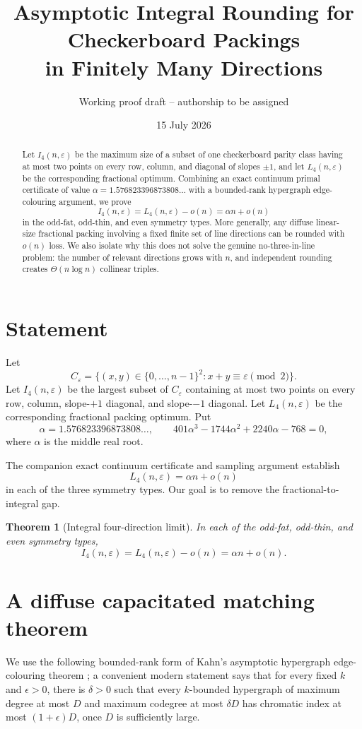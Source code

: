 \documentclass[11pt]{article}
\title{Asymptotic Integral Rounding for Checkerboard Packings\\in Finitely Many Directions}
\author{Working proof draft -- authorship to be assigned}
\date{15 July 2026}
\newtheorem{theorem}{Theorem}[section]
\begin{document}
\maketitle

\begin{abstract}
Let $I_4(n,\varepsilon)$ be the maximum size of a subset of one checkerboard parity class having at most two points on every row, column, and diagonal of slopes $\pm1$, and let $L_4(n,\varepsilon)$ be the corresponding fractional optimum. Combining an exact continuum primal certificate of value $\alpha=1.576823396873808\ldots$ with a bounded-rank hypergraph edge-colouring argument, we prove
\[
I_4(n,\varepsilon)=L_4(n,\varepsilon)-o(n)=\alpha n+o(n)
\]
in the odd-fat, odd-thin, and even symmetry types. More generally, any diffuse linear-size fractional packing involving a fixed finite set of line directions can be rounded with $o(n)$ loss. We also isolate why this does not solve the genuine no-three-in-line problem: the number of relevant directions grows with $n$, and independent rounding creates $\Theta(n\log n)$ collinear triples.
\end{abstract}

\section{Statement}
Let
\[
C_\varepsilon=\{(x,y)\in\{0,\dots,n-1\}^2:x+y\equiv\varepsilon\pmod2\}.
\]
Let $I_4(n,\varepsilon)$ be the largest subset of $C_\varepsilon$ containing at most two points on every row, column, slope-$+1$ diagonal, and slope-$-1$ diagonal. Let $L_4(n,\varepsilon)$ be the corresponding fractional packing optimum. Put
\[
\alpha=1.576823396873808\ldots,
\qquad
401\alpha^3-1744\alpha^2+2240\alpha-768=0,
\]
where $\alpha$ is the middle real root.

The companion exact continuum certificate and sampling argument establish
\[
L_4(n,\varepsilon)=\alpha n+o(n)
\tag{1.1}
\]
in each of the three symmetry types. Our goal is to remove the fractional-to-integral gap.

\begin{theorem}[Integral four-direction limit]
In each of the odd-fat, odd-thin, and even symmetry types,
\[
I_4(n,\varepsilon)=L_4(n,\varepsilon)-o(n)=\alpha n+o(n).
\]
\end{theorem}

\section{A diffuse capacitated matching theorem}
We use the following bounded-rank form of Kahn's asymptotic hypergraph edge-colouring theorem \cite{Kahn1996}; a convenient modern statement says that for every fixed $k$ and $\epsilon>0$, there is $\delta>0$ such that every $k$-bounded hypergraph of maximum degree at most $D$ and maximum codegree at most $\delta D$ has chromatic index at most $(1+\epsilon)D$, once $D$ is sufficiently large.
\end{document}
